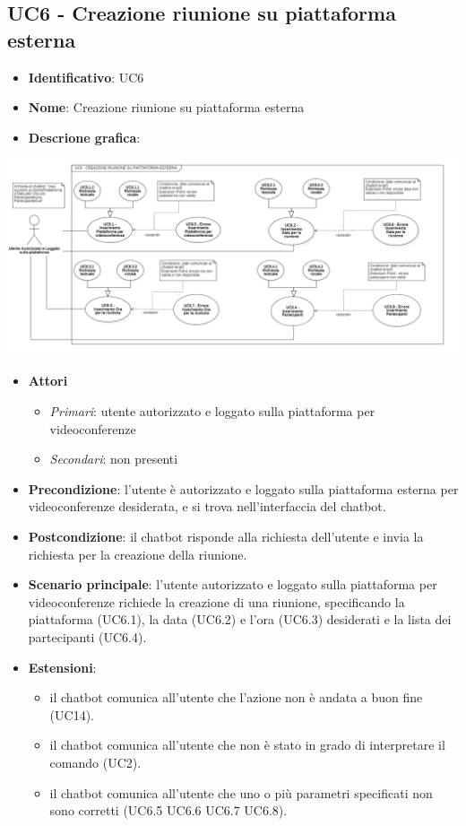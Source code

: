 \subsection{UC6 - Creazione riunione su piattaforma esterna}
\begin{itemize}
    \item \textbf{Identificativo}: UC6
    \item \textbf{Nome}: Creazione riunione su piattaforma esterna
    \item \textbf{Descrione grafica}:
\end{itemize}
\begin{center}
    \includegraphics{images/UC6.png} 
\end{center}
 \begin{itemize}
    \item \textbf{Attori}
 \begin{itemize} 
    \item \textit{Primari}: utente autorizzato e loggato sulla piattaforma per videoconferenze
    \item \textit{Secondari}: non presenti
 \end{itemize}
 \item \textbf{Precondizione}: l'utente è autorizzato e loggato sulla piattaforma esterna per videoconferenze desiderata, e si trova nell'interfaccia del chatbot.
 \item \textbf{Postcondizione}: il chatbot risponde alla richiesta dell'utente e invia la richiesta per la creazione della riunione.
 \item \textbf{Scenario principale}: l'utente autorizzato e loggato sulla piattaforma per videoconferenze richiede la creazione di una riunione, specificando la piattaforma (UC6.1), la data (UC6.2) e l'ora (UC6.3) desiderati e la lista dei partecipanti (UC6.4).
 \item \textbf{Estensioni}: 
 \begin{itemize} 
    \item il chatbot comunica all'utente che l'azione non è andata a buon fine (UC14).
    \item il chatbot comunica all'utente che non è stato in grado di interpretare il comando (UC2).
    \item il chatbot comunica all'utente che uno o più parametri specificati non sono corretti (UC6.5 UC6.6 UC6.7 UC6.8).
 \end{itemize}
\end{itemize}
\newpage
